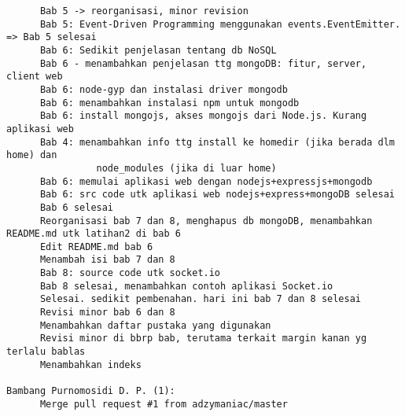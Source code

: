\begin{lstlisting}
      Bab 5 -> reorganisasi, minor revision
      Bab 5: Event-Driven Programming menggunakan events.EventEmitter. => Bab 5 selesai
      Bab 6: Sedikit penjelasan tentang db NoSQL
      Bab 6 - menambahkan penjelasan ttg mongoDB: fitur, server, client web
      Bab 6: node-gyp dan instalasi driver mongodb
      Bab 6: menambahkan instalasi npm untuk mongodb
      Bab 6: install mongojs, akses mongojs dari Node.js. Kurang aplikasi web
      Bab 4: menambahkan info ttg install ke homedir (jika berada dlm home) dan 
				node_modules (jika di luar home)
      Bab 6: memulai aplikasi web dengan nodejs+expressjs+mongodb
      Bab 6: src code utk aplikasi web nodejs+express+mongoDB selesai
      Bab 6 selesai
      Reorganisasi bab 7 dan 8, menghapus db mongoDB, menambahkan README.md utk latihan2 di bab 6
      Edit README.md bab 6
      Menambah isi bab 7 dan 8
      Bab 8: source code utk socket.io
      Bab 8 selesai, menambahkan contoh aplikasi Socket.io
      Selesai. sedikit pembenahan. hari ini bab 7 dan 8 selesai
      Revisi minor bab 6 dan 8
      Menambahkan daftar pustaka yang digunakan
      Revisi minor di bbrp bab, terutama terkait margin kanan yg terlalu bablas
      Menambahkan indeks

Bambang Purnomosidi D. P. (1):
      Merge pull request #1 from adzymaniac/master
\end{lstlisting}

